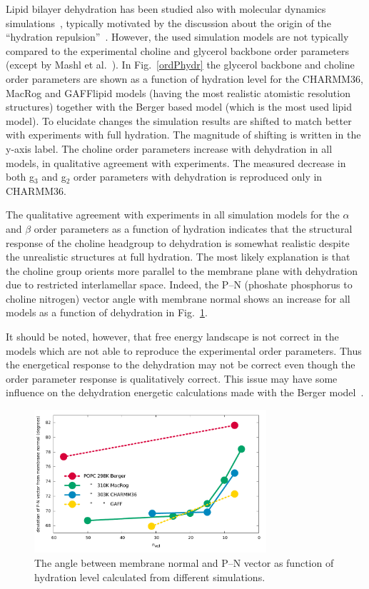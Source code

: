 \documentclass[journal=jacsat,manuscript=article]{achemso}
\begin{document}
Lipid bilayer dehydration has been studied also with molecular dynamics simulations~\cite{mashl01,pertsin05,pertsin07,eun09,eun10,schneck12},
typically motivated by the  discussion about the origin of the ``hydration repulsion''~\cite{israelachvili,israelachvili96,sparr11}.
However, the used simulation models are not typically compared to the experimental choline and glycerol backbone
order parameters (except by Mashl et al.~\cite{mashl01}).
In Fig.~\ref{ordPhydr} the glycerol backbone and choline order parameters are shown as a function of hydration level for the CHARMM36, 
MacRog and GAFFlipid models (having the most realistic atomistic resolution structures) together with the Berger based model 
(which is the most used lipid model). 
To elucidate changes the simulation results are shifted to match better with experiments with full hydration.
The magnitude of shifting is written in the y-axis label.
The choline order parameters increase with dehydration in all
models, in qualitative agreement with experiments. 
The measured decrease in both g$_3$ and g$_2$ order parameters with dehydration is reproduced only in CHARMM36.

The qualitative agreement with experiments in all simulation models for the $\alpha$ and $\beta$ order parameters  
as a function of hydration indicates that the structural response of the choline headgroup to dehydration is somewhat realistic
despite the unrealistic structures at full hydration. 
The most likely explanation is that the choline group
orients more parallel to the membrane plane with dehydration due to restricted interlamellar space. 
Indeed, the P--N (phoshate phosphorus to choline nitrogen) vector angle with membrane normal shows an increase for
all models as a function of dehydration in Fig.~\ref{PNangle}.

It should be noted, however, that free energy landscape is not correct in the models which
are not able to reproduce the experimental order parameters. Thus the energetical response
to the dehydration may not be correct even though the order parameter response is qualitatively correct.
This issue may have some influence on the dehydration energetic calculations made with the Berger model~\cite{eun09,schneck12}.
\begin{figure}[]
  \centering
  \includegraphics[width=8.6cm]{../DATAreportediINblog/dehydrationPN.pdf}

  \caption{\label{PNangle}
    The angle between membrane normal and P--N vector as function of
    hydration level calculated from different simulations.
  }
\end{figure}
\end{document}
